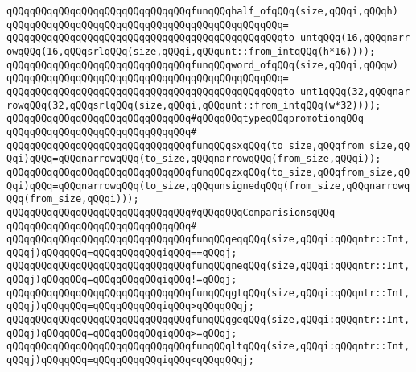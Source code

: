 \newline
\verb|qQQqqQQqqQQqqQQqqQQqqQQqqQQqqQQqfunqQQqhalf_ofqQQq(size,qQQqi,qQQqh)|\newline
\verb|qQQqqQQqqQQqqQQqqQQqqQQqqQQqqQQqqQQqqQQqqQQqqQQq=|\newline
\verb|qQQqqQQqqQQqqQQqqQQqqQQqqQQqqQQqqQQqqQQqqQQqqQQqto_untqQQq(16,qQQqnarrowqQQq(16,qQQqsrlqQQq(size,qQQqi,qQQqunt::from_intqQQq(h*16))));|\newline
\newline
\verb|qQQqqQQqqQQqqQQqqQQqqQQqqQQqqQQqfunqQQqword_ofqQQq(size,qQQqi,qQQqw)|\newline
\verb|qQQqqQQqqQQqqQQqqQQqqQQqqQQqqQQqqQQqqQQqqQQqqQQq=|\newline
\verb|qQQqqQQqqQQqqQQqqQQqqQQqqQQqqQQqqQQqqQQqqQQqqQQqto_unt1qQQq(32,qQQqnarrowqQQq(32,qQQqsrlqQQq(size,qQQqi,qQQqunt::from_intqQQq(w*32))));|\newline
\newline
\verb|qQQqqQQqqQQqqQQqqQQqqQQqqQQqqQQq#qQQqqQQqtypeqQQqpromotionqQQq|\newline
\verb|qQQqqQQqqQQqqQQqqQQqqQQqqQQqqQQq#|\newline
\verb|qQQqqQQqqQQqqQQqqQQqqQQqqQQqqQQqfunqQQqsxqQQq(to_size,qQQqfrom_size,qQQqi)qQQq=qQQqnarrowqQQq(to_size,qQQqnarrowqQQq(from_size,qQQqi));|\newline
\verb|qQQqqQQqqQQqqQQqqQQqqQQqqQQqqQQqfunqQQqzxqQQq(to_size,qQQqfrom_size,qQQqi)qQQq=qQQqnarrowqQQq(to_size,qQQqunsignedqQQq(from_size,qQQqnarrowqQQq(from_size,qQQqi)));|\newline
\newline
\verb|qQQqqQQqqQQqqQQqqQQqqQQqqQQqqQQq#qQQqqQQqComparisionsqQQq|\newline
\verb|qQQqqQQqqQQqqQQqqQQqqQQqqQQqqQQq#|\newline
\verb|qQQqqQQqqQQqqQQqqQQqqQQqqQQqqQQqfunqQQqeqqQQq(size,qQQqi:qQQqntr::Int,qQQqj)qQQqqQQq=qQQqqQQqqQQqiqQQq==qQQqj;|\newline
\verb|qQQqqQQqqQQqqQQqqQQqqQQqqQQqqQQqfunqQQqneqQQq(size,qQQqi:qQQqntr::Int,qQQqj)qQQqqQQq=qQQqqQQqqQQqiqQQq!=qQQqj;|\newline
\verb|qQQqqQQqqQQqqQQqqQQqqQQqqQQqqQQqfunqQQqgtqQQq(size,qQQqi:qQQqntr::Int,qQQqj)qQQqqQQq=qQQqqQQqqQQqiqQQq>qQQqqQQqj;|\newline
\verb|qQQqqQQqqQQqqQQqqQQqqQQqqQQqqQQqfunqQQqgeqQQq(size,qQQqi:qQQqntr::Int,qQQqj)qQQqqQQq=qQQqqQQqqQQqiqQQq>=qQQqj;|\newline
\verb|qQQqqQQqqQQqqQQqqQQqqQQqqQQqqQQqfunqQQqltqQQq(size,qQQqi:qQQqntr::Int,qQQqj)qQQqqQQq=qQQqqQQqqQQqiqQQq<qQQqqQQqj;|\newline
